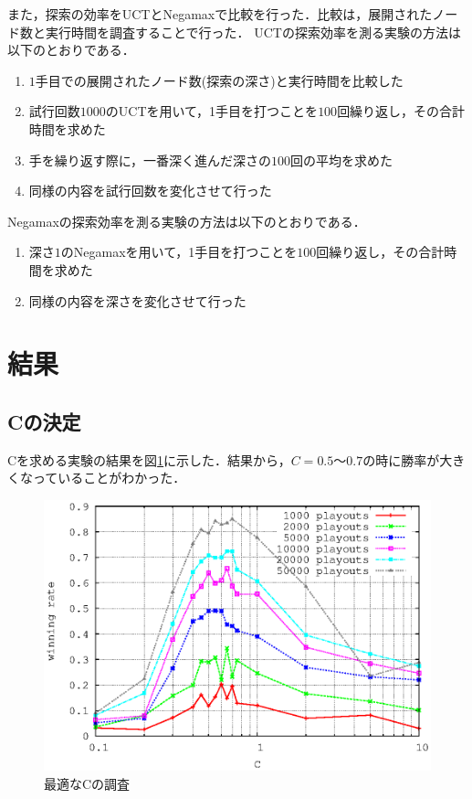 \documentclass{jarticle}
\begin{document}
また，探索の効率をUCTとNegamaxで比較を行った．比較は，展開されたノード数と実行時間を調査することで行った．
UCTの探索効率を測る実験の方法は以下のとおりである．

\begin{enumerate}
	\item $1$手目での展開されたノード数(探索の深さ)と実行時間を比較した
	\item 試行回数$1000$のUCTを用いて，1手目を打つことを$100$回繰り返し，その合計時間を求めた
	\item 手を繰り返す際に，一番深く進んだ深さの$100$回の平均を求めた
	\item 同様の内容を試行回数を変化させて行った
\end{enumerate}

Negamaxの探索効率を測る実験の方法は以下のとおりである．
\begin{enumerate}
	\item 深さ$1$のNegamaxを用いて，1手目を打つことを$100$回繰り返し，その合計時間を求めた
	\item 同様の内容を深さを変化させて行った
\end{enumerate}



\section{結果}
\subsection{Cの決定}
Cを求める実験の結果を図\ref{fig:seek_C}に示した．結果から，$C=0.5$〜$0.7$の時に勝率が大きくなっていることがわかった．

\begin{figure}[H]
	\centering
	\includegraphics[width=130mm]{image/seek_C.eps}
	\caption{最適なCの調査\label{fig:seek_C}}
\end{figure}
\end{document}
